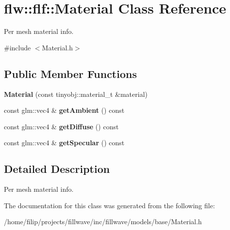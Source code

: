 \hypertarget{classflw_1_1flf_1_1Material}{}\section{flw\+:\+:flf\+:\+:Material Class Reference}
\label{classflw_1_1flf_1_1Material}


Per mesh material info.  




{\ttfamily \#include $<$Material.\+h$>$}

\subsection*{Public Member Functions}
\begin{DoxyCompactItemize}
\item 
\mbox{\label{classflw_1_1flf_1_1Material_a78fdabb0c96712b35ca5d91ba8b66713}} 
{\bfseries Material} (const tinyobj\+::material\+\_\+t \&material)
\item 
\mbox{\label{classflw_1_1flf_1_1Material_a87431f457e1d2791a33299c245e57881}} 
const glm\+::vec4 \& {\bfseries get\+Ambient} () const
\item 
\mbox{\label{classflw_1_1flf_1_1Material_a2f186a0cb50b8611eaecbfcfd2272af2}} 
const glm\+::vec4 \& {\bfseries get\+Diffuse} () const
\item 
\mbox{\label{classflw_1_1flf_1_1Material_a43f9b02adfd62f3705ffc39dd752798b}} 
const glm\+::vec4 \& {\bfseries get\+Specular} () const
\end{DoxyCompactItemize}


\subsection{Detailed Description}
Per mesh material info. 

The documentation for this class was generated from the following file\+:\begin{DoxyCompactItemize}
\item 
/home/filip/projects/fillwave/inc/fillwave/models/base/Material.\+h\end{DoxyCompactItemize}
